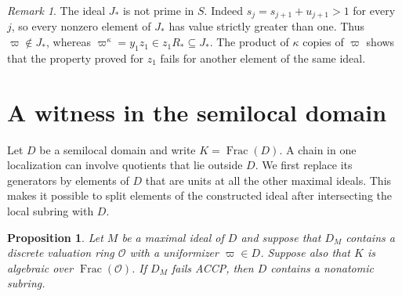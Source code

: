 \documentclass[11pt, letterpaper]{article}
\newtheorem{proposition}[theorem]{Proposition}
\theoremstyle{definition}
\theoremstyle{remark}
\newtheorem{remark}[theorem]{Remark}
\DeclareMathOperator{\Frac}{Frac}
\begin{document}
\begin{remark}
    \label{rem:nonprime}
    The ideal $J_{*}$ is not prime in $S$.
    Indeed $s_j = s_{j + 1} + u_{j + 1} > 1$ for every $j$, so every nonzero element of $J_{*}$ has value strictly greater than one.
    Thus $\varpi \notin J_{*}$, whereas $\varpi^{\kappa} = y_1 z_1 \in z_1 R_{*} \subseteq J_{*}$.
    The product of $\kappa$ copies of $\varpi$ shows that the property proved for $z_1$ fails for another element of the same ideal.
\end{remark}

\section{A witness in the semilocal domain}
\label{sec:semilocal}

Let $D$ be a semilocal domain and write $K = \Frac(D)$.
A chain in one localization can involve quotients that lie outside $D$.
We first replace its generators by elements of $D$ that are units at all the other maximal ideals.
This makes it possible to split elements of the constructed ideal after intersecting the local subring with $D$.

\begin{proposition}
    \label{prop:semilocal-witness}
    Let $M$ be a maximal ideal of $D$ and suppose that $D_{M}$ contains a discrete valuation ring $\mathcal{O}$ with a uniformizer $\varpi \in D$.
    Suppose also that $K$ is algebraic over $\Frac(\mathcal{O})$.
    If $D_{M}$ fails ACCP, then $D$ contains a nonatomic subring.
\end{proposition}
\end{document}
